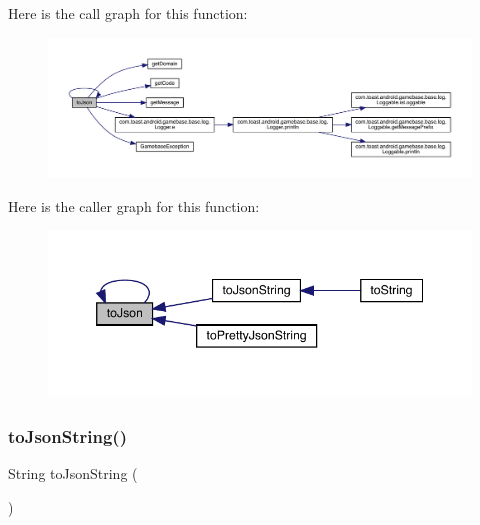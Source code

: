 Here is the call graph for this function\+:
\nopagebreak
\begin{figure}[H]
\begin{center}
\leavevmode
\includegraphics[width=350pt]{classcom_1_1toast_1_1android_1_1gamebase_1_1base_1_1_gamebase_exception_a6b2a39146828e6b135949df810b8e052_cgraph}
\end{center}
\end{figure}
Here is the caller graph for this function\+:
\nopagebreak
\begin{figure}[H]
\begin{center}
\leavevmode
\includegraphics[width=346pt]{classcom_1_1toast_1_1android_1_1gamebase_1_1base_1_1_gamebase_exception_a6b2a39146828e6b135949df810b8e052_icgraph}
\end{center}
\end{figure}
\mbox{\label{classcom_1_1toast_1_1android_1_1gamebase_1_1base_1_1_gamebase_exception_a58acf6402880e9769d79d8667581fa6a}} 
\subsubsection{\texorpdfstring{to\+Json\+String()}{toJsonString()}}
{\footnotesize\ttfamily String to\+Json\+String (\begin{DoxyParamCaption}{ }\end{DoxyParamCaption})}

